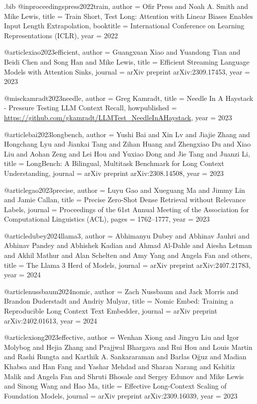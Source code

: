 \begin{filecontents*}{\jobname.bib}
@inproceedings{press2022train,
  author    = {Ofir Press and Noah A. Smith and Mike Lewis},
  title     = {Train Short, Test Long: Attention with Linear Biases Enables Input Length Extrapolation},
  booktitle = {International Conference on Learning Representations (ICLR)},
  year      = {2022}
}

@article{xiao2023efficient,
  author    = {Guangxuan Xiao and Yuandong Tian and Beidi Chen and Song Han and Mike Lewis},
  title     = {Efficient Streaming Language Models with Attention Sinks},
  journal   = {arXiv preprint arXiv:2309.17453},
  year      = {2023}
}

@misc{kamradt2023needle,
  author       = {Greg Kamradt},
  title        = {Needle In A Haystack - Pressure Testing {LLM} Context Recall},
  howpublished = {\url{https://github.com/gkamradt/LLMTest_NeedleInAHaystack}},
  year         = {2023}
}

@article{bai2023longbench,
  author    = {Yushi Bai and Xin Lv and Jiajie Zhang and Hongchang Lyu and Jiankai Tang and Zihan Huang and Zhengxiao Du and Xiao Liu and Aohan Zeng and Lei Hou and Yuxiao Dong and Jie Tang and Juanzi Li},
  title     = {LongBench: A Bilingual, Multitask Benchmark for Long Context Understanding},
  journal   = {arXiv preprint arXiv:2308.14508},
  year      = {2023}
}

@article{gao2023precise,
  author    = {Luyu Gao and Xueguang Ma and Jimmy Lin and Jamie Callan},
  title     = {Precise Zero-Shot Dense Retrieval without Relevance Labels},
  journal   = {Proceedings of the 61st Annual Meeting of the Association for Computational Linguistics (ACL)},
  pages     = {1762--1777},
  year      = {2023}
}

@article{dubey2024llama3,
  author    = {Abhimanyu Dubey and Abhinav Jauhri and Abhinav Pandey and Abhishek Kadian and Ahmad Al-Dahle and Aiesha Letman and Akhil Mathur and Alan Schelten and Amy Yang and Angela Fan and others},
  title     = {The Llama 3 Herd of Models},
  journal   = {arXiv preprint arXiv:2407.21783},
  year      = {2024}
}

@article{nussbaum2024nomic,
  author    = {Zach Nussbaum and Jack Morris and Brandon Duderstadt and Andriy Mulyar},
  title     = {Nomic Embed: Training a Reproducible Long Context Text Embedder},
  journal   = {arXiv preprint arXiv:2402.01613},
  year      = {2024}
}

@article{xiong2023effective,
  author    = {Wenhan Xiong and Jingyu Liu and Igor Molybog and Hejia Zhang and Prajjwal Bhargava and Rui Hou and Louis Martin and Rashi Rungta and Karthik A. Sankararaman and Barlas O{\u{g}}uz and Madian Khabsa and Han Fang and Yashar Mehdad and Sharan Narang and Kshitiz Malik and Angela Fan and Shruti Bhosale and Sergey Edunov and Mike Lewis and Sinong Wang and Hao Ma},
  title     = {Effective Long-Context Scaling of Foundation Models},
  journal   = {arXiv preprint arXiv:2309.16039},
  year      = {2023}
}


\end{filecontents*}
